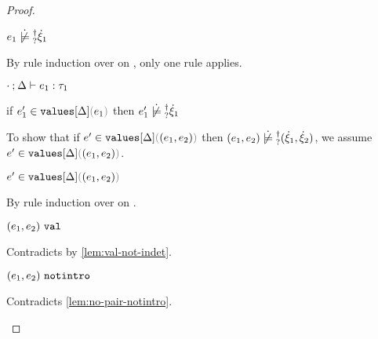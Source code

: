 \begin{proof}
\begin{byCases}
\begin{byCases}
\begin{byCases}
\begin{byCases}
          \item[\cnotsatisfyormay{e_1}{\hxi_1}]
          \begin{pfsteps*}
          \item $\cnotsatisfyormay{e_1}{\hxi_1}$  
          \end{pfsteps*}
          By rule induction over  on , only one rule applies.
          \begin{byCases}
            \item[\text{(\ref{rule:TPair})}]
            \begin{pfsteps*}
            \item $\cdot \mathbin{;} \Delta \vdash e_1 : \tau_1$  
            \item if $\inValues{e_1'}{\Delta}{e_1}$ then $\cnotsatisfyormay{e_1'}{\hxi_1}$  
            \end{pfsteps*} 
            To show that if $\inValues{e'}{\Delta}{\hpair{e_1}{e_2}}$ then $\cnotsatisfyormay{\hpair{e_1}{e_2}}{\cpair{\hxi_1}{\hxi_2}}$, we assume $\inValues{e'}{\Delta}{\hpair{e_1}{e_2}}$.
            \begin{pfsteps*}
            \item $\inValues{e'}{\Delta}{\hpair{e_1}{e_2}}$  
            \end{pfsteps*}
            By rule induction over  on .
            \begin{byCases}
              \item[\text{(\ref{rule:IVVal})}]
              \begin{pfsteps*}
              \item $(e_1 , e_2) ~\mathtt{val}$ 
              \end{pfsteps*} 
              Contradicts  by \autoref{lem:val-not-indet}.
              \item[\text{(\ref{rule:IVIndet})}] 
              \begin{pfsteps*}
              \item $(e_1 , e_2) ~\mathtt{notintro}$ 
              \end{pfsteps*}
              Contradicts \autoref{lem:no-pair-notintro}.

\end{byCases}
\end{byCases}
\end{byCases}
\end{byCases}
\end{byCases}
\end{byCases}
\end{proof}
